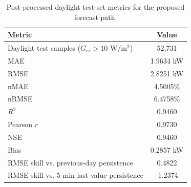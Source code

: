 \begin{table}[!t]
\caption{Post-processed daylight test-set metrics for the proposed forecast path.}
\label{tab:headline_metrics}
\centering
\small
\begin{tabularx}{\columnwidth}{@{}>{\raggedright\arraybackslash}X c@{}}
\toprule
Metric & Value \\
\midrule
Daylight test samples ($G_{cs}>10$ W/m$^2$) & 52,731 \\
MAE & 1.9634 kW \\
RMSE & 2.8251 kW \\
nMAE & 4.5005\% \\
nRMSE & 6.4758\% \\
$R^2$ & 0.9460 \\
Pearson $r$ & 0.9730 \\
NSE & 0.9460 \\
Bias & 0.2857 kW \\
RMSE skill vs. previous-day persistence & 0.4822 \\
RMSE skill vs. 5-min last-value persistence & -1.2374 \\
\bottomrule
\end{tabularx}
\end{table}
